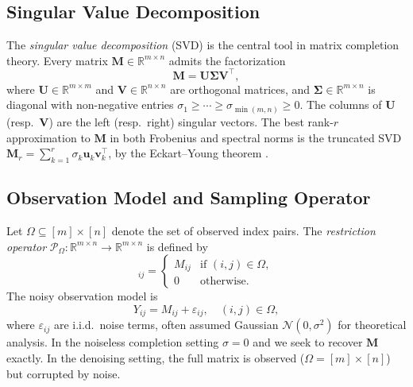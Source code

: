 \documentclass[conference]{IEEEtran}
\begin{document}
\subsection{Singular Value Decomposition}

The \emph{singular value decomposition} (SVD) is the central tool in matrix completion theory. Every matrix $\mathbf{M} \in \mathbb{R}^{m \times n}$ admits the factorization
\begin{equation}
  \mathbf{M} = \mathbf{U} \boldsymbol{\Sigma} \mathbf{V}^\top,
  \label{eq:svd}
\end{equation}
where $\mathbf{U} \in \mathbb{R}^{m \times m}$ and $\mathbf{V} \in \mathbb{R}^{n \times n}$ are orthogonal matrices, and $\boldsymbol{\Sigma} \in \mathbb{R}^{m \times n}$ is diagonal with non-negative entries $\sigma_1 \geq \cdots \geq \sigma_{\min(m,n)} \geq 0$. The columns of $\mathbf{U}$ (resp.\ $\mathbf{V}$) are the left (resp.\ right) singular vectors. The best rank-$r$ approximation to $\mathbf{M}$ in both Frobenius and spectral norms is the truncated SVD $\mathbf{M}_r = \sum_{k=1}^r \sigma_k \mathbf{u}_k \mathbf{v}_k^\top$, by the Eckart--Young theorem \cite{golub2013matrix}.

\subsection{Observation Model and Sampling Operator}

Let $\Omega \subseteq [m] \times [n]$ denote the set of observed index pairs. The \emph{restriction operator} $\mathcal{P}_\Omega : \mathbb{R}^{m \times n} \to \mathbb{R}^{m \times n}$ is defined by
\begin{equation}
  [\mathcal{P}_\Omega(\mathbf{M})]_{ij} =
  \begin{cases}
    M_{ij} & \text{if } (i,j) \in \Omega, \\
    0 & \text{otherwise.}
  \end{cases}
\end{equation}
The noisy observation model is
\begin{equation}
  Y_{ij} = M_{ij} + \varepsilon_{ij}, \quad (i,j) \in \Omega,
  \label{eq:obs_model}
\end{equation}
where $\varepsilon_{ij}$ are i.i.d.\ noise terms, often assumed Gaussian $\mathcal{N}(0, \sigma^2)$ for theoretical analysis. In the noiseless completion setting $\sigma = 0$ and we seek to recover $\mathbf{M}$ exactly. In the denoising setting, the full matrix is observed ($\Omega = [m]\times[n]$) but corrupted by noise.
\end{document}
